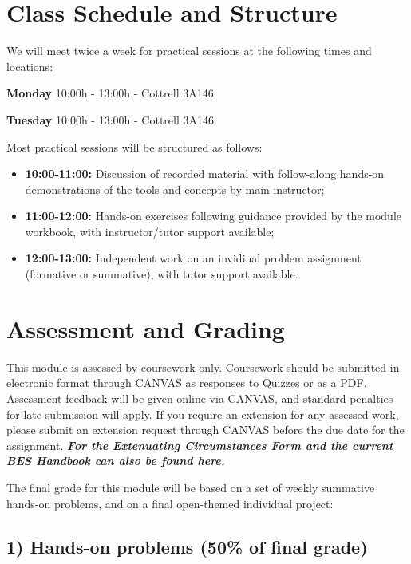 \documentclass[
]{book}
\providecommand{\tightlist}{%
  \setlength{\itemsep}{0pt}\setlength{\parskip}{0pt}}
\begin{document}
\hypertarget{class-schedule-and-structure}{%
\section{Class Schedule and Structure}\label{class-schedule-and-structure}}

We will meet twice a week for practical sessions at the following times and locations:

\textbf{Monday} 10:00h - 13:00h - Cottrell 3A146

\textbf{Tuesday} 10:00h - 13:00h - Cottrell 3A146

Most practical sessions will be structured as follows:

\begin{itemize}
\tightlist
\item
  \textbf{10:00-11:00:} Discussion of recorded material with follow-along hands-on demonstrations of the tools and concepts by main instructor;
\item
  \textbf{11:00-12:00:} Hands-on exercises following guidance provided by the module workbook, with instructor/tutor support available;
\item
  \textbf{12:00-13:00:} Independent work on an invidiual problem assignment (formative or summative), with tutor support available.
\end{itemize}

\hypertarget{assessment-and-grading}{%
\section{Assessment and Grading}\label{assessment-and-grading}}

This module is assessed by coursework only. Coursework should be submitted in electronic format through CANVAS as responses to Quizzes or as a PDF. Assessment feedback will be given online via CANVAS, and standard penalties for late submission will apply. If you require an extension for any assessed work, please submit an extension request through CANVAS before the due date for the assignment.
\textbf{\emph{For the Extenuating Circumstances Form and the current BES Handbook can also
be found here.}}

The final grade for this module will be based on a set of weekly summative hands-on problems, and on a final open-themed individual project:

\hypertarget{hands-on-problems-50-of-final-grade}{%
\subsection*{1) Hands-on problems (50\% of final grade)}\label{hands-on-problems-50-of-final-grade}}
\end{document}
